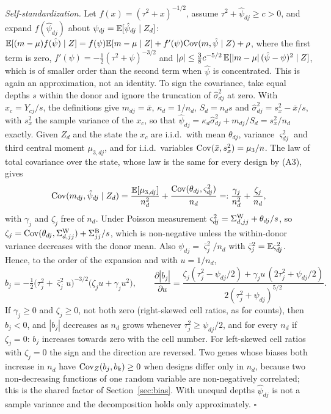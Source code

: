 \emph{Self-standardization.} Let $f(x)=(\tau^2+x)^{-1/2}$, assume $\tau^2+\hat\psi_{dj}\ge c>0$, and expand $f(\hat\psi_{dj})$ about $\psi_{dj}=\mathbb{E}[\hat\psi_{dj}\mid Z_d]$: $\mathbb{E}[(m-\mu)f(\hat\psi)\mid Z]=f(\psi)\mathbb{E}[m-\mu\mid Z]+f'(\psi)\mathrm{Cov}(m,\hat\psi\mid Z)+\rho$, where the first term is zero, $f'(\psi)=-\tfrac12(\tau^2+\psi)^{-3/2}$ and $|\rho|\le\tfrac38c^{-5/2}\,\mathbb{E}[|m-\mu|\,(\hat\psi-\psi)^2\mid Z]$, which is of smaller order than the second term when $\hat\psi$ is concentrated. This is again an approximation, not an identity. To sign the covariance, take equal depths $s$ within the donor and ignore the truncation of $\hat\sigma^2_{dj}$ at zero. With $x_c=Y_{cj}/s$, the definitions give $m_{dj}=\bar x$, $\kappa_d=1/n_d$, $S_d=n_ds$ and $\hat\sigma^2_{dj}=s_x^2-\bar x/s$, with $s_x^2$ the sample variance of the $x_c$, so that $\hat\psi_{dj}=\kappa_d\hat\sigma^2_{dj}+m_{dj}/S_d=s_x^2/n_d$ exactly. Given $Z_d$ and the state the $x_c$ are i.i.d.\ with mean $\theta_{dj}$, variance $\varsigma^2_{dj}$ and third central moment $\mu_{3,dj}$, and for i.i.d.\ variables $\mathrm{Cov}(\bar x,s_x^2)=\mu_3/n$. The law of total covariance over the state, whose law is the same for every design by (A3), gives
\[\mathrm{Cov}(m_{dj},\hat\psi_{dj}\mid Z_d)=\frac{\mathbb{E}[\mu_{3,dj}]}{n_d^2}+\frac{\mathrm{Cov}(\theta_{dj},\varsigma^2_{dj})}{n_d}=:\frac{\gamma_j}{n_d^2}+\frac{\zeta_j}{n_d},\]
with $\gamma_j$ and $\zeta_j$ free of $n_d$. Under Poisson measurement $\varsigma^2_{dj}=\Sigma^{\mathrm{W}}_{d,jj}+\theta_{dj}/s$, so $\zeta_j=\mathrm{Cov}(\theta_{dj},\Sigma^{\mathrm{W}}_{d,jj})+\Sigma^{\mathrm{B}}_{jj}/s$, which is non-negative unless the within-donor variance decreases with the donor mean. Also $\psi_{dj}=\bar\varsigma^2_j/n_d$ with $\bar\varsigma^2_j=\mathbb{E}\varsigma^2_{dj}$. Hence, to the order of the expansion and with $u=1/n_d$,
\[b_j=-\tfrac12\big(\tau_j^2+\bar\varsigma^2_ju\big)^{-3/2}\big(\zeta_ju+\gamma_ju^2\big),\qquad\frac{\partial|b_j|}{\partial u}=\frac{\zeta_j(\tau_j^2-\psi_{dj}/2)+\gamma_ju\,(2\tau_j^2+\psi_{dj}/2)}{2(\tau_j^2+\psi_{dj})^{5/2}}.\]
If $\gamma_j\ge0$ and $\zeta_j\ge0$, not both zero (right-skewed cell ratios, as for counts), then $b_j<0$, and $|b_j|$ decreases as $n_d$ grows whenever $\tau_j^2\ge\psi_{dj}/2$, and for every $n_d$ if $\zeta_j=0$: $b_j$ increases towards zero with the cell number. For left-skewed cell ratios with $\zeta_j=0$ the sign and the direction are reversed. Two genes whose biases both increase in $n_d$ have $\mathrm{Cov}_Z(b_j,b_k)\ge0$ when designs differ only in $n_d$, because two non-decreasing functions of one random variable are non-negatively correlated; this is the shared factor of Section~\ref{sec:bias}. With unequal depths $\hat\psi_{dj}$ is not a sample variance and the decomposition holds only approximately. $\square$

